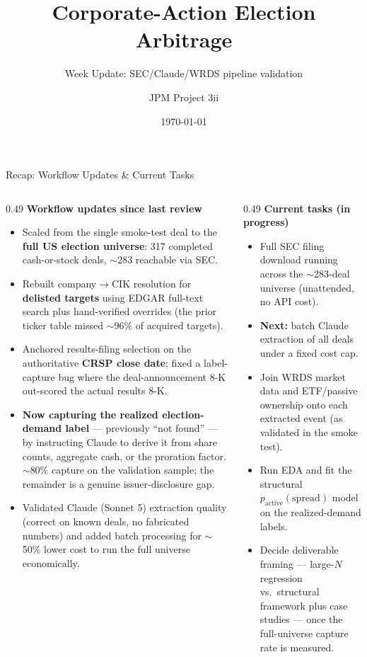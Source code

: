 \documentclass[aspectratio=169,11pt]{beamer}
\title[Pipeline Validation]{Corporate-Action Election Arbitrage}
\subtitle{Week Update: SEC/Claude/WRDS pipeline validation}
\author{JPM Project 3ii}
\date{\today}
\begin{document}
\begin{frame}
  \titlepage
\end{frame}

\begin{frame}{Recap: Workflow Updates \& Current Tasks}
\footnotesize
\begin{columns}[T]
\begin{column}{0.49\linewidth}
\textbf{Workflow updates since last review}
\begin{itemize}
  \item Scaled from the single smoke-test deal to the \textbf{full US election universe}: 317 completed cash-or-stock deals, $\sim$283 reachable via SEC.
  \item Rebuilt company$\rightarrow$CIK resolution for \textbf{delisted targets} using EDGAR full-text search plus hand-verified overrides (the prior ticker table missed $\sim$96\% of acquired targets).
  \item Anchored results-filing selection on the authoritative \textbf{CRSP close date}; fixed a label-capture bug where the deal-announcement 8-K out-scored the actual results 8-K.
  \item \textbf{Now capturing the realized election-demand label} --- previously ``not found'' --- by instructing Claude to derive it from share counts, aggregate cash, or the proration factor. $\sim$80\% capture on the validation sample; the remainder is a genuine issuer-disclosure gap.
  \item Validated Claude (Sonnet 5) extraction quality (correct on known deals, no fabricated numbers) and added batch processing for $\sim$50\% lower cost to run the full universe economically.
\end{itemize}
\end{column}
\begin{column}{0.49\linewidth}
\textbf{Current tasks (in progress)}
\begin{itemize}
  \item Full SEC filing download running across the $\sim$283-deal universe (unattended, no API cost).
  \item \textbf{Next:} batch Claude extraction of all deals under a fixed cost cap.
  \item Join WRDS market data and ETF/passive ownership onto each extracted event (as validated in the smoke test).
  \item Run EDA and fit the structural $p_{\text{active}}(\text{spread})$ model on the realized-demand labels.
  \item Decide deliverable framing --- large-$N$ regression vs.\ structural framework plus case studies --- once the full-universe capture rate is measured.
\end{itemize}
\end{column}
\end{columns}
\end{frame}
\end{document}
